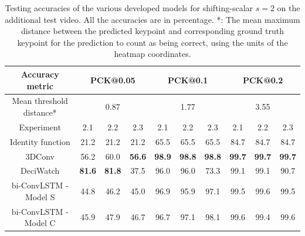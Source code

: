 \documentclass[./main.tex]{subfiles}
\begin{document}
\begin{table}[htbp]
    \begin{tabular}{c||ccc|ccc|ccc}
        \hline
        Accuracy metric & \multicolumn{3}{c}{PCK@0.05} & \multicolumn{3}{c}{PCK@0.1} & \multicolumn{3}{c}{PCK@0.2} \\
        \hline
        Mean threshold distance* & \multicolumn{3}{c}{0.87} & \multicolumn{3}{c}{1.77} & \multicolumn{3}{c}{3.55} \\
        \hline
        Experiment & 2.1 & 2.2 & 2.3 & 2.1 & 2.2 & 2.3 & 2.1 & 2.2 & 2.3 \\
        \hline
        \hline
        Identity function & 21.2 & 21.2 & 21.2 & 65.5 & 65.5 & 65.5 & 84.7 & 84.7 & 84.7 \\
        3DConv & 56.2 & 60.0 & \textbf{56.6} & \textbf{98.9} & \textbf{98.8} & \textbf{98.8} & \textbf{99.7} & \textbf{99.7} & \textbf{99.7} \\
        DeciWatch & \textbf{81.6} & \textbf{81.8} & 37.5 & 96.0 & 96.0 & 73.3 & 99.1 & 99.1 & 90.7 \\
        bi-ConvLSTM - Model S & 44.8 & 46.2 & 45.0 & 96.9 & 95.9 & 97.1 & 99.5 & 99.6 & 99.5 \\
        bi-ConvLSTM - Model C & 45.9 & 47.9 & 46.7 & 96.7 & 97.1 & 98.1 & 99.6 & 99.4 & 99.6 \\
        \hline
    \end{tabular}
    \caption{Testing accuracies of the various developed models for shifting-scalar $s = 2$ on the additional test video. All the accuracies are in percentage. *: The mean maximum distance between the predicted keypoint and corresponding ground truth keypoint for the prediction to count as being correct, using the units of the heatmap coordinates.}
    \label{tab:finetune_test_accs_4}
\end{table}
\end{document}
